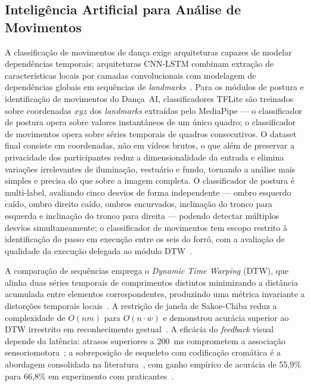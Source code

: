 \subsection{Inteligência Artificial para Análise de Movimentos}
\label{sub:ia}

A classificação de movimentos de dança exige arquiteturas capazes de modelar
dependências temporais: arquiteturas CNN-LSTM combinam extração de
características locais por camadas convolucionais com modelagem de dependências
globais em sequências de \textit{landmarks}~\cite{ruiz2023dl_timeseries,
ncbi_dance_emotional}. Para os módulos de postura e identificação de movimentos
do Dança~AI, classificadores TFLite são treinados sobre coordenadas $xyz$ dos
\textit{landmarks} extraídas pelo MediaPipe --- o classificador de postura opera
sobre valores instantâneos de um único quadro; o classificador de movimentos opera
sobre séries temporais de quadros consecutivos. O dataset final consiste em
coordenadas, não em vídeos brutos, o que além de
preservar a privacidade dos participantes reduz a dimensionalidade da entrada
e elimina variações irrelevantes de iluminação, vestuário e fundo, tornando a
análise mais simples e precisa do que sobre a imagem completa. O classificador de postura é multi-label, avaliando cinco desvios de forma
independente --- ombro esquerdo caído, ombro direito caído, ombros encurvados,
inclinação do tronco para esquerda e inclinação do tronco para direita ---
podendo detectar múltiplos desvios simultaneamente; o classificador de
movimentos tem escopo restrito à identificação do passo em execução entre os
seis do forró, com a avaliação de qualidade da execução delegada ao módulo
DTW~\cite{bursa2023tflite, roggio2024pose}.

A comparação de sequências emprega o \textit{Dynamic Time Warping} (DTW), que
alinha duas séries temporais de comprimentos distintos minimizando a distância
acumulada entre elementos correspondentes, produzindo uma métrica invariante a
distorções temporais locais~\cite{dynamic_dance_warping}. A restrição de janela
de Sakoe-Chiba reduz a complexidade de $O(nm)$ para $O(n \cdot w)$ e
demonstrou acurácia superior ao DTW irrestrito em reconhecimento
gestual~\cite{10.1145/3598151.3598181, gesture_dtw_skeleton}. A eficácia do
\textit{feedback} visual depende da latência: atrasos superiores a 200~ms
comprometem a associação sensoriomotora~\cite{plos_feedback_delay,
pmc_movement_feedback_assist}; a sobreposição de esqueleto com codificação
cromática é a abordagem consolidada na
literatura~\cite{THARATIPYAKUL2024e36589}, com ganho empírico de acurácia de
55,9\% para 66,8\% em experimento com praticantes~\cite{stanford_ai_dance_coaching}.

